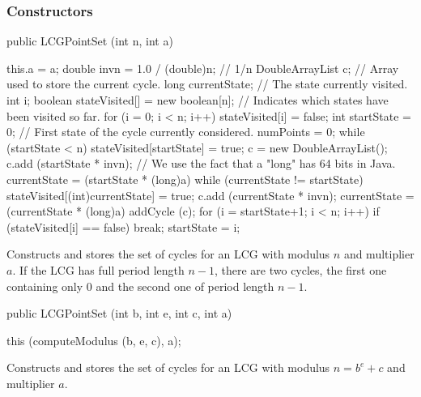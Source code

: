 \subsubsection* {Constructors}
\begin{code}

   public LCGPointSet (int n, int a) \begin{hide} {
      this.a = a;
      double invn = 1.0 / (double)n;   // 1/n
      DoubleArrayList c;  // Array used to store the current cycle.
      long currentState;  // The state currently visited. 
      int i;
      boolean stateVisited[] = new boolean[n];  
         // Indicates which states have been visited so far.
      for (i = 0; i < n; i++)
         stateVisited[i] = false;
      int startState = 0;    // First state of the cycle currently considered.
      numPoints = 0;
      while (startState < n) {
         stateVisited[startState] = true;
         c = new DoubleArrayList();
         c.add (startState * invn);
         // We use the fact that a "long" has 64 bits in Java.
         currentState = (startState * (long)a) %
         while (currentState != startState) {
            stateVisited[(int)currentState] = true;
            c.add (currentState * invn);
            currentState = (currentState * (long)a) %
            }
         addCycle (c);
         for (i = startState+1; i < n; i++)
            if (stateVisited[i] == false)
                break;
         startState = i;
         }
      }\end{hide}
\end{code}
 \begin{tabb} Constructs and stores the set of cycles for an LCG with
   modulus $n$ and multiplier $a$.
  If the LCG has full period length $n-1$,
  there are two cycles, the first one containing only 0 
  and the second one of period length $n-1$.
 \end{tabb}
\begin{htmlonly}
\end{htmlonly}
\begin{code}

   public LCGPointSet (int b, int e, int c, int a) \begin{hide} {
      this (computeModulus (b, e, c), a);
   }\end{hide}
\end{code}
 \begin{tabb} Constructs and stores the set of cycles for an LCG with
   modulus $n = b^e + c$ and multiplier $a$.
 \end{tabb}
